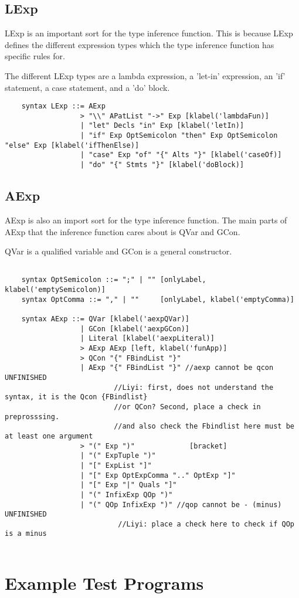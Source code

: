 \subsection{LExp}
LExp is an important sort for the type inference function. This is because LExp defines the different expression types which the type inference function has specific rules for.

The different LExp types are a lambda expression, a 'let-in' expression, an 'if' statement, a case statement, and a 'do' block.

\begin{lstlisting}
    syntax LExp ::= AExp
                  > "\\" APatList "->" Exp [klabel('lambdaFun)]
                  | "let" Decls "in" Exp [klabel('letIn)]
                  | "if" Exp OptSemicolon "then" Exp OptSemicolon "else" Exp [klabel('ifThenElse)]
                  | "case" Exp "of" "{" Alts "}" [klabel('caseOf)]
                  | "do" "{" Stmts "}" [klabel('doBlock)]

\end{lstlisting}

\subsection{AExp}
AExp is also an import sort for the type inference function. The main parts of AExp that the inference function cares about is QVar and GCon.

QVar is a qualified variable and GCon is a general constructor.
\begin{lstlisting}

    syntax OptSemicolon ::= ";" | "" [onlyLabel, klabel('emptySemicolon)]
    syntax OptComma ::= "," | ""     [onlyLabel, klabel('emptyComma)]

    syntax AExp ::= QVar [klabel('aexpQVar)]
                  | GCon [klabel('aexpGCon)]
                  | Literal [klabel('aexpLiteral)]
                  > AExp AExp [left, klabel('funApp)]
                  > QCon "{" FBindList "}"
                  | AExp "{" FBindList "}" //aexp cannot be qcon UNFINISHED
                          //Liyi: first, does not understand the syntax, it is the Qcon {FBindlist}
                          //or QCon? Second, place a check in preprosssing.
                          //and also check the Fbindlist here must be at least one argument
                  > "(" Exp ")"             [bracket]
                  | "(" ExpTuple ")"
                  | "[" ExpList "]"
                  | "[" Exp OptExpComma ".." OptExp "]"
                  | "[" Exp "|" Quals "]"
                  | "(" InfixExp QOp ")"
                  | "(" QOp InfixExp ")" //qop cannot be - (minus) UNFINISHED
                           //Liyi: place a check here to check if QOp is a minus
                           
\end{lstlisting}

\section{Example Test Programs}
